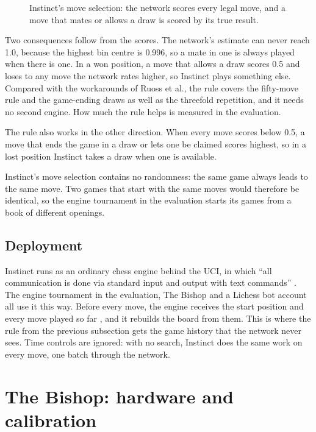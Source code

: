 \begin{figure}[htbp]
  \centering
  
  \caption{Instinct's move selection: the network scores every legal move, and a move that mates or allows a draw is scored by its true result.}
  \label{fig:move-selection}
\end{figure}

Two consequences follow from the scores.
The network's estimate can never reach 1.0, because the highest bin centre is 0.996, so a mate in one is always played when there is one.
In a won position, a move that allows a draw scores 0.5 and loses to any move the network rates higher, so Instinct plays something else.
Compared with the workarounds of Ruoss et al., the rule covers the fifty-move rule and the game-ending draws as well as the threefold repetition, and it needs no second engine.
How much the rule helps is measured in the evaluation.

The rule also works in the other direction.
When every move scores below 0.5, a move that ends the game in a draw or lets one be claimed scores highest, so in a lost position Instinct takes a draw when one is available.

Instinct's move selection contains no randomness: the same game always leads to the same move.
Two games that start with the same moves would therefore be identical, so the engine tournament in the evaluation starts its games from a book of different openings.

\subsection{Deployment}
\label{subsec:deployment}

Instinct runs as an ordinary chess engine behind the \ac{UCI}, in which ``all communication is done via standard input and output with text commands'' \cite{uci}.
The engine tournament in the evaluation, The Bishop and a Lichess bot account all use it this way.
Before every move, the engine receives the start position and every move played so far \cite{uci}, and it rebuilds the board from them.
This is where the rule from the previous subsection gets the game history that the network never sees.
Time controls are ignored: with no search, Instinct does the same work on every move, one batch through the network.

\section{The Bishop: hardware and calibration}
\label{sec:bishop-hardware}

